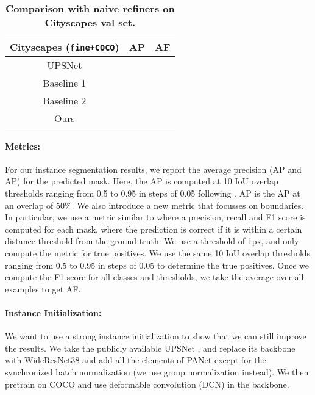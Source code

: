 \documentclass[10pt,twocolumn,letterpaper]{article}
\begin{document}
\begin{table}[t!]
\centering
{\begin{footnotesize}
  \begin{tabular}{|c|cc|}
  \hline
  Cityscapes (\texttt{fine+COCO}) & AP  & AF  \\ 
  \hline 
  UPSNet & &\\
Baseline 1
  & &\\
Baseline 2
  & &\\
  Ours & & \\   
  \hline 
  \end{tabular}
  \end{footnotesize}}
  \caption{\textbf{
Comparison with naive refiners on Cityscapes val set.} }
  \label{tab:inst-val-results}
  \vspace{-4mm}
\end{table}


\vspace{-2mm}

\paragraph{Metrics:}
For our instance segmentation results, we report the average precision (AP and AP) for the predicted mask. Here, the AP is computed at 10 IoU overlap thresholds ranging from 0.5 to 0.95 in steps of 0.05 following \cite{cityscapes}. AP is the AP at an overlap of 50\%. 
We also introduce a new metric that focusses on  boundaries.  In particular, we use a metric similar to \cite{wang2019delse, Perazzi2016} where a precision, recall and F1 score is computed for each mask,  where the prediction is correct if it is within a certain distance threshold from the ground truth. We use a threshold of 1px, and only compute the metric for  true positives. We   use the same 10 IoU overlap thresholds ranging from 0.5 to 0.95 in steps of 0.05 to determine the true positives. Once we compute the F1 score for all classes and thresholds, we take the average over all  examples to get AF. 

\vspace{-2mm}

\paragraph{Instance Initialization:}
We want to use a strong instance initialization to show that we can still improve the results.  We take the publicly available UPSNet \cite{upsnet}, and replace its backbone with WideResNet38 \cite{wideresnet} and add all the elements of PANet \cite{panet} except for the synchronized batch normalization (we use group normalization instead). We then pretrain on COCO  and use deformable convolution (DCN) \cite{dcn} in the backbone. 
\end{document}
